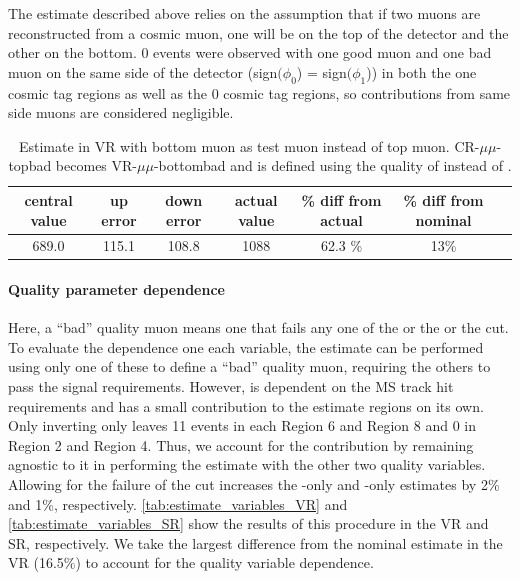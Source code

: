 The estimate described above relies on the assumption that if two muons are reconstructed from a cosmic muon, one will be on the top of the detector and the other on the bottom. 0 events were observed with one good muon and one bad muon on the same side of the detector (sign$(\phi_{0}$) = sign$(\phi_{1}$)) in both the one cosmic tag regions as well as the 0 cosmic tag regions, so contributions from same side muons are considered negligible.

\begin{table}
\centering
\small
\begin{tabular}{ccccccc}
central value  & up error & down error & actual value & \% diff from actual & \% diff from nominal\\
\hline
689.0  & 115.1 & 108.8 & 1088 & 62.3 \% & 13\% \\
\hline
\end{tabular}
\caption{Estimate in VR with bottom muon as test muon instead of top muon. CR-$\mu\mu$-topbad becomes VR-$\mu\mu$-bottombad and \rgood is defined using the quality of \mb instead of \mt.}
\label{tab:syst-orientation}
\end{table}


\paragraph{Quality parameter dependence}

Here, a ``bad'' quality muon means one that fails any one of the \nprecision or the \nphi or the \chiCB cut. To evaluate the dependence one each variable, the estimate can be performed using only one of these to define a ``bad'' quality muon, requiring the others to pass the signal requirements. However, \chiCB is dependent on the MS track hit requirements and has a small contribution to the estimate regions on its own. Only inverting only \chiCB leaves 11 events in each Region 6 and Region 8 and 0 in Region 2 and Region 4. Thus, we account for the \chiCB contribution by remaining agnostic to it in performing the estimate with the other two quality variables.  Allowing for the failure of the \chiCB cut increases the \nprecision-only and \nphi-only estimates by 2\% and 1\%, respectively. \autoref{tab:estimate_variables_VR} and \autoref{tab:estimate_variables_SR} show the results of this procedure in the VR and SR, respectively. We take the largest difference from the nominal estimate in the VR (16.5\%) to account for the quality variable dependence. 

